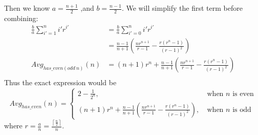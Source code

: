 \documentclass{article}
\begin{document}
\begin{enumerate}
\begin{enumerate}[label=(\alph*)]
            Then we know $a = \frac{n + 1}{2}$ ,and 
            $b = \frac{n - 1}{2}$. 
            We will simplify the first term before combining:
            \begin{align*}
                \frac{b}{a} \sum_{i'=1}^{n} i'r^{i'}  &= 
                \frac{b}{a} \sum_{i'=0}^{n} i'  r^{i'} \tag*{(Term 
                at $i'=0$ is 0)} \\
                &= \frac{n-1}{n+1} \left( \frac{n r^{n+1}}{ r - 1} -
                  \frac{r (  r^n - 1)}{
                 ( r - 1)^2} \right) \\
            Avg_ {has\_even (odd \: n)} (n) &= 
            (n+1)r^n  + 
             \frac{n-1}{n+1} \left( \frac{n r^{n+1}}{ r - 1} -
                  \frac{r (  r^n - 1)}{
                 ( r - 1)^2} \right) \\
            \end{align*}
            Thus the exact expression would be
            \begin{equation}
                Avg_ {has\_even} (n) = 
                \begin{cases}
                    2 - \frac{1}{2^n}, \:& \text{when $n$ is even}\\
            (n+1)r^n  + 
             \frac{n-1}{n+1} \left( \frac{n r^{n+1}}{ r - 1} -
                  \frac{r (  r^n - 1)}{
                 ( r - 1)^2} \right),
                 \: & \text{when $n$ is odd} 
                \end{cases}
            \end{equation}
            where 
            $r = \frac{a}{n} = \frac{\left\lceil \frac{n}{2} \right\rceil }{
            n}$.

    \end{enumerate}
\end{enumerate}
\end{document}
